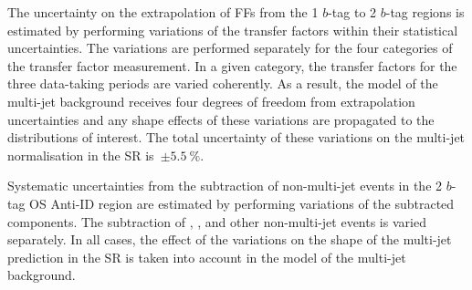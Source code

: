 The uncertainty on the extrapolation of FFs from the 1 $b$-tag to 2 $b$-tag
regions is estimated by performing variations of the transfer factors within
their statistical uncertainties. The variations are performed separately for the
four categories of the transfer factor measurement. In a given category, the
transfer factors for the three data-taking periods are varied coherently.  As a
result, the model of the multi-jet background receives four degrees of freedom
from extrapolation uncertainties and any shape effects of these variations are
propagated to the distributions of interest. The total uncertainty of these
variations on the multi-jet normalisation in the SR is~$\pm \SI{5.5}{\percent}$.

Systematic uncertainties from the subtraction of non-multi-jet events in the 2
$b$-tag OS Anti-ID region are estimated by performing variations of the
subtracted components. The subtraction of \ttbarTrue, \ttbarFakes, and other
non-multi-jet events is varied separately. In all cases, the effect of the
variations on the shape of the multi-jet prediction in the SR is taken into
account in the model of the multi-jet background.

